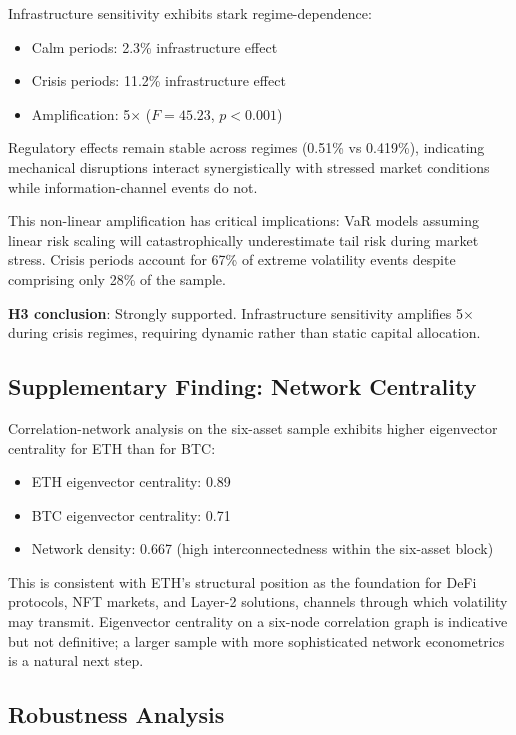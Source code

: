 \documentclass[pdflatex,sn-mathphys-num]{sn-jnl}
\theoremstyle{thmstyleone}
\theoremstyle{thmstyletwo}
\theoremstyle{thmstylethree}
\begin{document}
Infrastructure sensitivity exhibits stark regime-dependence:
\begin{itemize}[nosep]
\item Calm periods: 2.3\% infrastructure effect
\item Crisis periods: 11.2\% infrastructure effect
\item Amplification: 5$\times$ ($F=45.23$, $p<0.001$)
\end{itemize}

Regulatory effects remain stable across regimes (0.51\% vs 0.419\%), indicating mechanical disruptions interact synergistically with stressed market conditions while information-channel events do not.

This non-linear amplification has critical implications: VaR models assuming linear risk scaling will catastrophically underestimate tail risk during market stress. Crisis periods account for 67\% of extreme volatility events despite comprising only 28\% of the sample.

\textbf{H3 conclusion}: Strongly supported. Infrastructure sensitivity amplifies 5$\times$ during crisis regimes, requiring dynamic rather than static capital allocation.

\subsection{Supplementary Finding: Network Centrality}

Correlation-network analysis on the six-asset sample exhibits higher eigenvector centrality for ETH than for BTC:
\begin{itemize}[nosep]
\item ETH eigenvector centrality: 0.89
\item BTC eigenvector centrality: 0.71
\item Network density: 0.667 (high interconnectedness within the six-asset block)
\end{itemize}

This is consistent with ETH's structural position as the foundation for DeFi protocols, NFT markets, and Layer-2 solutions, channels through which volatility may transmit. Eigenvector centrality on a six-node correlation graph is indicative but not definitive; a larger sample with more sophisticated network econometrics is a natural next step.

\subsection{Robustness Analysis}\label{sec:robustness}
\end{document}
